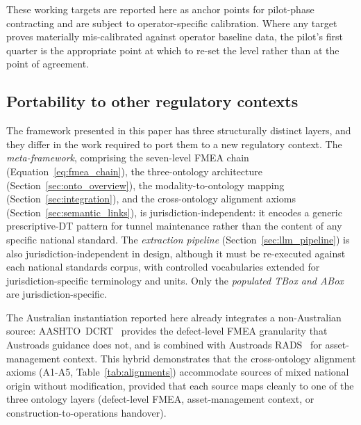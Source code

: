 \documentclass[11pt,a4paper]{article}
\begin{document}
These working targets are reported here as anchor points for pilot-phase contracting and are subject to operator-specific calibration. Where any target proves materially mis-calibrated against operator baseline data, the pilot's first quarter is the appropriate point at which to re-set the level rather than at the point of agreement.

\subsection{Portability to other regulatory contexts}

The framework presented in this paper has three structurally distinct layers, and they differ in the work required to port them to a new regulatory context. The \emph{meta-framework}, comprising the seven-level FMEA chain (Equation~\ref{eq:fmea_chain}), the three-ontology architecture (Section~\ref{sec:onto_overview}), the modality-to-ontology mapping (Section~\ref{sec:integration}), and the cross-ontology alignment axioms (Section~\ref{sec:semantic_links}), is jurisdiction-independent: it encodes a generic prescriptive-DT pattern for tunnel maintenance rather than the content of any specific national standard. The \emph{extraction pipeline} (Section~\ref{sec:llm_pipeline}) is also jurisdiction-independent in design, although it must be re-executed against each national standards corpus, with controlled vocabularies extended for jurisdiction-specific terminology and units. Only the \emph{populated TBox and ABox} are jurisdiction-specific.

The Australian instantiation reported here already integrates a non-Australian source: AASHTO~DCRT~\citep{AASHTO2009} provides the defect-level FMEA granularity that Austroads guidance does not, and is combined with Austroads RADS~\citep{AustroadsRADS2022} for asset-management context. This hybrid demonstrates that the cross-ontology alignment axioms (A1-A5, Table~\ref{tab:alignments}) accommodate sources of mixed national origin without modification, provided that each source maps cleanly to one of the three ontology layers (defect-level FMEA, asset-management context, or construction-to-operations handover).
\end{document}
